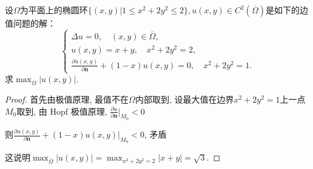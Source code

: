 \begin{exercise}
	设$\Omega$为平面上的椭圆环$\{(x,y)|1\leq x^2+2y^2\leq2\},u(x,y)\in C^2(\overline{\Omega})$是如下的边值问题的解：
	$$\begin{cases}
		\Delta u=0,\quad (x,y)\in\overline{\varOmega},\\
		u(x,y)=x+y,\quad x^2+2y^2=2,\\
		\displaystyle\frac{\partial u(x,y)}{\partial\bm{n}}+(1-x)u(x,y)=0,\quad x^2+2y^2=1.
	\end{cases}$$
	求$\displaystyle\max_{\overline{\Omega}}|u(x,y)|$.
\end{exercise}

\begin{proof}
	首先由极值原理, 最值不在$\varOmega$内部取到,
	设最大值在边界$x^2+2y^2=1$上一点$M_0$取到, 由 Hopf 极值原理, $\frac{\partial u}{\partial\bm{n}}|_{M_0}<0$
	
	则$\frac{\partial u(x,y)}{\partial\bm{n}}+(1-x)u(x,y)|_{M_{0}}<0$, 矛盾
	
	这说明$\max_{\overline{\Omega}}|u(x,y)|=\max_{x^{2}+2y^{2}=2}|x+y|=\sqrt{3}$.
\end{proof}